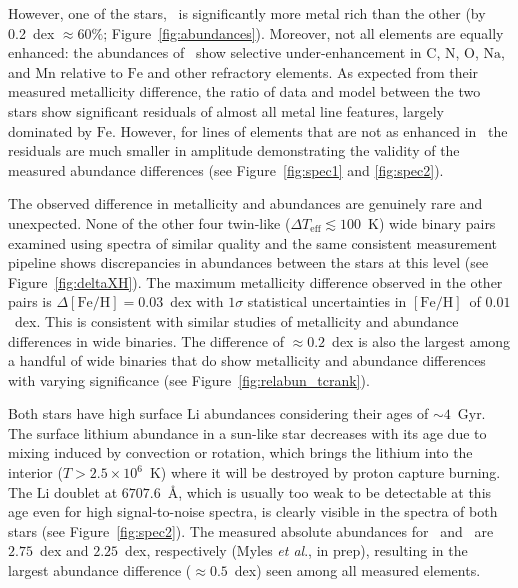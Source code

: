 \documentclass[12pt,letterpaper,margin=1in]{article}
\newcommand{\figname}{Figure}
\newcommand{\etal}{\textit{et al}.}
\newcommand*\elem[1]{\ensuremath{\mathrm{#1}}}
\newcommand*\elemH[1]{\ensuremath{[\mathrm{#1}/\elem{H}]}}
\newcommand*{\feh}{\ensuremath{\elemH{Fe}}}
\newcommand{\sunanalog}{\text{Krios}}
\newcommand{\bizarreone}{\text{Kronos}}
\begin{document}
However, one of the stars, \bizarreone\, is significantly more metal rich than
the other (by 0.2~dex $\approx 60\%$; \figname~\ref{fig:abundances}).
Moreover, not all elements are equally enhanced: the abundances of \bizarreone\
show selective under-enhancement in \elem{C}, \elem{N}, \elem{O}, \elem{Na},
and \elem{Mn} relative to \elem{Fe} and other refractory elements.
As expected from their measured metallicity difference, the ratio of data and
model between the two stars show significant residuals of almost all metal line
features, largely dominated by \elem{Fe}.
However, for lines of elements that are not as enhanced in \bizarreone\, the
residuals are much smaller in amplitude demonstrating the validity of the
measured abundance differences (see
Figure~\ref{fig:spec1} and \ref{fig:spec2}).

The observed difference in metallicity and abundances are genuinely rare and
unexpected.
None of the other four twin-like ($\Delta T_\mathrm{eff} \lesssim 100$~K) wide
binary pairs examined using spectra of similar quality and the same
consistent measurement pipeline shows discrepancies in abundances between the
stars at this level\cite{2016ApJS..225...32B} (see Figure~\ref{fig:deltaXH}).
The maximum metallicity difference observed in the other pairs is $\Delta\feh =
0.03$~dex with $1\sigma$ statistical uncertainties in \feh\ of $0.01$~dex.
This is consistent with similar studies of metallicity and abundance
differences in wide binaries\cite{Gratton:2001aa,Desidera:2004aa}.
The difference of $\approx 0.2$~dex is also the largest among a handful of wide
binaries that do show metallicity and abundance differences with varying
significance\cite{Mack:2014aa,Mack:2016aa,Saffe:2015aa,
  Teske:2013aa,Teske:2015aa,Teske:2016aa,Teske:2016ab,Biazzo:2015aa,Ramirez:2015aa}
(see Figure~\ref{fig:relabun_tcrank}).

Both stars have high surface \elem{Li} abundances considering
their ages of $\sim 4$~Gyr.
The surface lithium abundance in a sun-like star decreases with its age due to
mixing induced by convection or rotation, which brings the lithium into the
interior ($T>2.5 \times 10^{6}$~K) where it will be destroyed by proton capture
burning. %
The \elem{Li} doublet at $6707.6$~\AA, which is usually too weak to be
detectable at this age even for high signal-to-noise spectra, is clearly
visible in the spectra of both stars (see \figname~\ref{fig:spec2}).
The measured absolute abundances for \bizarreone\ and \sunanalog\ are
$2.75$~dex and $2.25$~dex, respectively (Myles \etal, in prep),
resulting in the largest abundance difference ($\approx 0.5$~dex) seen
among all measured elements.
\end{document}
